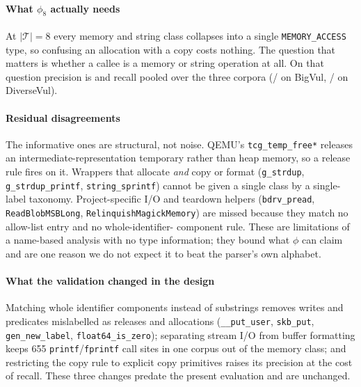 \paragraph{What $\phi_8$ actually needs} At $|\mathcal{T}|=8$ every memory and
string class collapses into a single \texttt{MEMORY\_ACCESS} type, so confusing
an allocation with a copy costs nothing. The question that matters is whether a
callee is a memory or string operation at all. On that question precision is
\numpooledMemopP{} and recall \numpooledMemopR{} pooled over the three corpora
(\numbigvulMemopP{}/\numbigvulMemopR{} on BigVul,
\numdiversevulMemopP{}/\numdiversevulMemopR{} on DiverseVul).

\paragraph{Residual disagreements} The informative ones are structural, not
noise. QEMU's \texttt{tcg\_temp\_free*} releases an intermediate-representation
temporary rather than heap memory, so a release rule fires on it. Wrappers that
allocate \emph{and} copy or format (\texttt{g\_strdup},
\texttt{g\_strdup\_printf}, \texttt{string\_sprintf}) cannot be given a single
class by a single-label taxonomy. Project-specific I/O and teardown helpers
(\texttt{bdrv\_pread}, \texttt{ReadBlobMSBLong}, \texttt{RelinquishMagickMemory})
are missed because they match no allow-list entry and no whole-identifier-
component rule. These are limitations of a name-based analysis with no type
information; they bound what $\phi$ can claim and are one reason we do not
expect it to beat the parser's own alphabet.

\paragraph{What the validation changed in the design} Matching whole identifier
components instead of substrings removes writes and predicates mislabelled as
releases and allocations (\texttt{\_\_put\_user}, \texttt{skb\_put},
\texttt{gen\_new\_label}, \texttt{float64\_is\_zero}); separating stream I/O
from buffer formatting keeps 655 \texttt{printf}/\texttt{fprintf} call sites in
one corpus out of the memory class; and restricting the copy rule to explicit
copy primitives raises its precision at the cost of recall. These three changes
predate the present evaluation and are unchanged.
